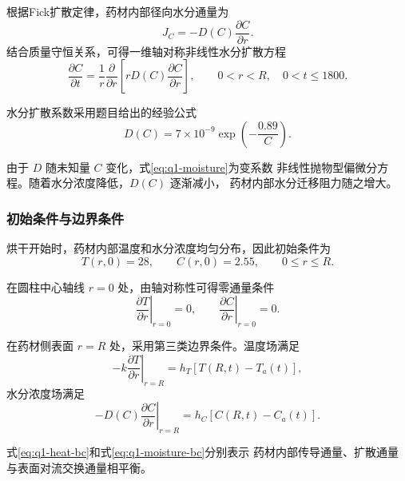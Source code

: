 \documentclass[12pt,a4paper]{article}
\renewcommand{\boxed}[1]{#1}
\begin{document}
根据Fick扩散定律，药材内部径向水分通量为
\begin{equation}
J_C=-D(C)\frac{\partial C}{\partial r}.
\end{equation}
结合质量守恒关系，可得一维轴对称非线性水分扩散方程
\begin{equation}
\boxed{
\frac{\partial C}{\partial t}
=
\frac{1}{r}
\frac{\partial}{\partial r}
\left[
rD(C)\frac{\partial C}{\partial r}
\right]
},
\qquad
0<r<R,\quad 0<t\le1800.
\label{eq:q1-moisture}
\end{equation}

水分扩散系数采用题目给出的经验公式
\begin{equation}
\boxed{
D(C)
=
7\times10^{-9}
\exp\left(-\frac{0.89}{C}\right)
}.
\label{eq:q1-diffusivity}
\end{equation}

由于 $D$ 随未知量 $C$ 变化，式\eqref{eq:q1-moisture}为变系数
非线性抛物型偏微分方程。随着水分浓度降低，$D(C)$ 逐渐减小，
药材内部水分迁移阻力随之增大。

\subsubsection{初始条件与边界条件}

烘干开始时，药材内部温度和水分浓度均匀分布，因此初始条件为
\begin{equation}
\boxed{
T(r,0)=28,\qquad C(r,0)=2.55
},
\qquad 0\le r\le R.
\label{eq:q1-initial}
\end{equation}

在圆柱中心轴线 $r=0$ 处，由轴对称性可得零通量条件
\begin{equation}
\boxed{
\left.\frac{\partial T}{\partial r}\right|_{r=0}=0,
\qquad
\left.\frac{\partial C}{\partial r}\right|_{r=0}=0
}.
\label{eq:q1-center}
\end{equation}

在药材侧表面 $r=R$ 处，采用第三类边界条件。温度场满足
\begin{equation}
\boxed{
-k\left.\frac{\partial T}{\partial r}\right|_{r=R}
=
h_T\left[T(R,t)-T_a(t)\right]
},
\label{eq:q1-heat-bc}
\end{equation}
水分浓度场满足
\begin{equation}
\boxed{
-D(C)\left.\frac{\partial C}{\partial r}\right|_{r=R}
=
h_C\left[C(R,t)-C_a(t)\right]
}.
\label{eq:q1-moisture-bc}
\end{equation}

式\eqref{eq:q1-heat-bc}和式\eqref{eq:q1-moisture-bc}分别表示
药材内部传导通量、扩散通量与表面对流交换通量相平衡。
\end{document}
